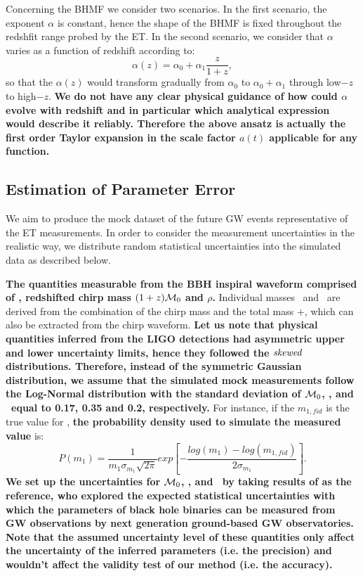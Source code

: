 \documentclass[twocolumn]{aastex62}
\newcommand{\kai}[1]{\textcolor{red}{[{\bf Kai}: #1]}}
\newcommand{\blue}[1]{{\bf #1}}
\begin{document}
Concerning the BHMF we consider two scenarios. In the first scenario, the exponent $\alpha$ is constant, hence the shape of the BHMF is fixed throughout the redshfit range probed by the ET. In the second scenario, we consider that $\alpha$ varies as a function of redshift according to:
 \begin{equation} \label{equ_alphaz}
\alpha(z) = \alpha_0 + \alpha_1\frac{z}{1+z} , 
 \end{equation}
so that the $\alpha(z)$ would transform gradually from $\alpha_0$ to $\alpha_0+\alpha_1$ through low$-z$ to high$-z$. \textbf{We do not have any clear physical guidance of how could $\alpha$ evolve  with redshift and in particular which analytical expression would describe it reliably. Therefore the above ansatz is actually the first order Taylor expansion in the scale factor $a(t)$ applicable for any function.}

\subsection{Estimation of Parameter Error} \label{sec_noiselevel}
We aim to produce the mock dataset of the future GW events representative of the ET  measurements. In order to consider the measurement uncertainties in the realistic way, we distribute random statistical uncertainties into the simulated data as described below.

\textbf{The quantities measurable from the BBH inspiral waveform comprised of \dl, redshifted chirp mass $(1+z){\cal M}_0 $ and $\rho$.} Individual masses \mone\ and \mtwo\ are derived from the combination of the chirp mass and the total mass \mone+\mtwo, which can also be extracted from the chirp waveform. 
\blue{Let us note that physical quantities inferred from the LIGO detections had asymmetric upper and lower uncertainty limits, hence they followed the  ${\it skewed}$  distributions. Therefore, instead of the symmetric Gaussian distribution, we assume that the simulated mock measurements follow the Log-Normal distribution with the standard deviation of  ${\cal M}_0$, \dl, and \mone\ equal to 0.17, 0.35 and 0.2, respectively.}
For instance, if the $m_{1,fid}$ is the true value for \mone, \blue{the probability density used to simulate the measured value} is:
 \begin{equation} \label{equ_lognorm}
P(m_1) = \frac{1}{m_1 \sigma_{m_1} \sqrt{2\pi}} exp \left[- \frac{log(m_1)-log(m_{1,fid})}{2\sigma_{m_1}} \right].
 \end{equation}
\blue{We set up the uncertainties for ${\cal M}_0$, \dl, and \mone\ by taking results of \citet{Ghosh2016} as the reference, who explored the expected statistical uncertainties with which the parameters of black hole binaries can be measured from GW observations by next generation ground-based GW observatories. Note that the assumed uncertainty level of these quantities only affect the uncertainty of the inferred parameters (i.e. the precision) and wouldn't affect the validity test of our method (i.e. the  accuracy).
}
 
\end{document}
